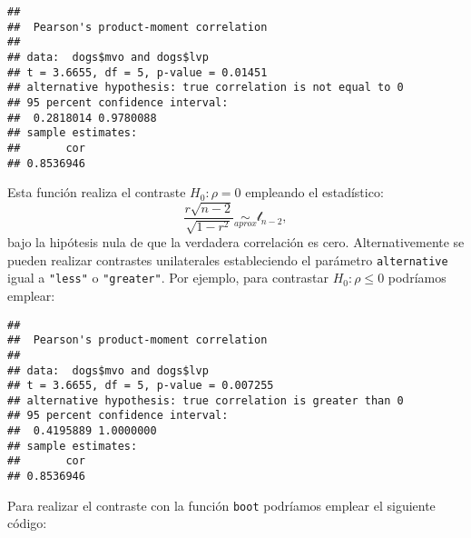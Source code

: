\documentclass[
]{book}
\newenvironment{Shaded}{\begin{snugshade}}{\end{snugshade}}
\newcommand{\CommentTok}[1]{\textcolor[rgb]{0.56,0.35,0.01}{\textit{#1}}}
\newcommand{\ControlFlowTok}[1]{\textcolor[rgb]{0.13,0.29,0.53}{\textbf{#1}}}
\newcommand{\DataTypeTok}[1]{\textcolor[rgb]{0.13,0.29,0.53}{#1}}
\newcommand{\DecValTok}[1]{\textcolor[rgb]{0.00,0.00,0.81}{#1}}
\newcommand{\KeywordTok}[1]{\textcolor[rgb]{0.13,0.29,0.53}{\textbf{#1}}}
\newcommand{\NormalTok}[1]{#1}
\newcommand{\OperatorTok}[1]{\textcolor[rgb]{0.81,0.36,0.00}{\textbf{#1}}}
\newcommand{\StringTok}[1]{\textcolor[rgb]{0.31,0.60,0.02}{#1}}
\theoremstyle{definition}
\theoremstyle{definition}
\theoremstyle{definition}
\theoremstyle{remark}
\begin{document}
\begin{verbatim}
## 
##  Pearson's product-moment correlation
## 
## data:  dogs$mvo and dogs$lvp
## t = 3.6655, df = 5, p-value = 0.01451
## alternative hypothesis: true correlation is not equal to 0
## 95 percent confidence interval:
##  0.2818014 0.9780088
## sample estimates:
##       cor 
## 0.8536946
\end{verbatim}

Esta función realiza el contraste \(H_0: \rho = 0\) empleando el estadístico:
\[\frac{r\sqrt{n - 2}}{\sqrt{1 - r^2}} \underset{aprox}{\sim } \mathcal{t}_{n-2},\]
bajo la hipótesis nula de que la verdadera correlación es cero.
Alternativemente se pueden realizar contrastes unilaterales estableciendo
el parámetro \texttt{alternative} igual a \texttt{"less"} o \texttt{"greater"}.
Por ejemplo, para contrastar \(H_0: \rho \leq 0\) podríamos emplear:

\begin{Shaded}
\end{Shaded}

\begin{verbatim}
## 
##  Pearson's product-moment correlation
## 
## data:  dogs$mvo and dogs$lvp
## t = 3.6655, df = 5, p-value = 0.007255
## alternative hypothesis: true correlation is greater than 0
## 95 percent confidence interval:
##  0.4195889 1.0000000
## sample estimates:
##       cor 
## 0.8536946
\end{verbatim}

Para realizar el contraste con la función \texttt{boot} podríamos
emplear el siguiente código:

\begin{Shaded}
\end{Shaded}
\end{document}
